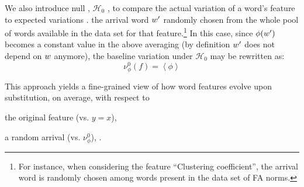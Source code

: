 We also introduce  null , $\mathcal{H}_0$ , to compare the actual variation of a word's feature to expected variations .
 the arrival word $w'$  randomly chosen from the whole pool of words available in the data set for that feature.\footnote{
For instance, when considering the feature ``Clustering coefficient'', the arrival word is randomly chosen among words present in the data set of FA norms.
}
In this case, since $\phi(w')$ becomes a constant value in the above averaging (by definition $w'$ does not depend on $w$ anymore), the baseline variation under $\mathcal{H}_0$ may be rewritten as:
$$\nu_{\phi}^0 (f) = \left<\phi\right>$$

This approach yields a fine-grained view of how word features evolve upon substitution, on average, with respect to
\begin{seriate}
\item the original feature (\hbox{vs.} $y=x$),
\item a random arrival (\hbox{vs.} $\nu_{\phi}^0$), .
\end{seriate}

\medskip

